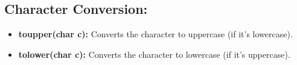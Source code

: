 \documentclass{report}
\begin{document}
    \subsection{Character Conversion:}
    \begin{itemize}
        \item \textbf{toupper(char c):} Converts the character to uppercase (if it's lowercase).
        \item \textbf{tolower(char c):} Converts the character to lowercase (if it's uppercase).
    \end{itemize}


    \pagebreak \bigbreak \noindent 
\end{document}
